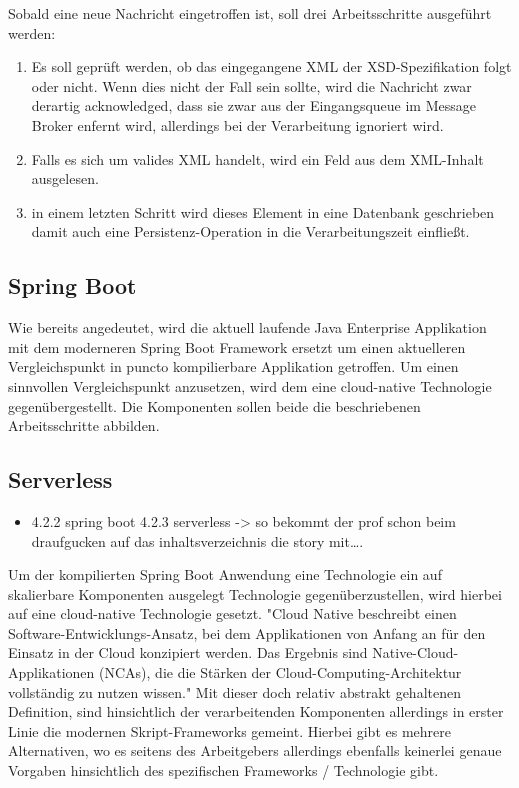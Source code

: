 
Sobald eine neue Nachricht eingetroffen ist, soll drei Arbeitsschritte ausgeführt werden:

\begin{enumerate}

  \item Es soll geprüft werden, ob das eingegangene XML der XSD-Spezifikation folgt oder nicht. Wenn dies nicht der Fall sein sollte, wird die Nachricht zwar derartig acknowledged, dass sie zwar aus der Eingangsqueue im Message Broker enfernt wird, allerdings bei der Verarbeitung ignoriert wird.

  \item Falls es sich um valides XML handelt, wird ein Feld aus dem XML-Inhalt ausgelesen.

  \item in einem letzten Schritt wird dieses Element in eine Datenbank geschrieben damit auch eine Persistenz-Operation in die Verarbeitungszeit einfließt.

\end{enumerate}

\subsection{Spring Boot}
Wie bereits angedeutet, wird die aktuell laufende Java Enterprise Applikation mit dem moderneren Spring Boot Framework ersetzt um einen aktuelleren Vergleichspunkt in puncto kompilierbare Applikation getroffen. Um einen sinnvollen Vergleichspunkt anzusetzen, wird dem eine cloud-native Technologie gegenübergestellt. Die Komponenten sollen beide die beschriebenen Arbeitsschritte abbilden.

\subsection{Serverless}
\begin{itemize}
  \item  4.2.2 spring boot 4.2.3 serverless -> so bekommt der prof schon beim draufgucken auf das inhaltsverzeichnis die story mit….
\end{itemize}
Um der kompilierten Spring Boot Anwendung eine Technologie ein auf skalierbare Komponenten ausgelegt Technologie gegenüberzustellen, wird hierbei auf eine cloud-native Technologie gesetzt. "Cloud Native beschreibt einen Software-Entwicklungs-Ansatz, bei dem Applikationen von Anfang an für den Einsatz in der Cloud konzipiert werden. Das Ergebnis sind Native-Cloud-Applikationen (NCAs), die die Stärken der Cloud-Computing-Architektur vollständig zu nutzen wissen." \cite{cn-def} Mit dieser doch relativ abstrakt gehaltenen Definition, sind hinsichtlich der verarbeitenden Komponenten allerdings in erster Linie die modernen Skript-Frameworks gemeint. Hierbei gibt es mehrere Alternativen, wo es seitens des Arbeitgebers allerdings ebenfalls keinerlei genaue Vorgaben hinsichtlich des spezifischen Frameworks / Technologie gibt.

